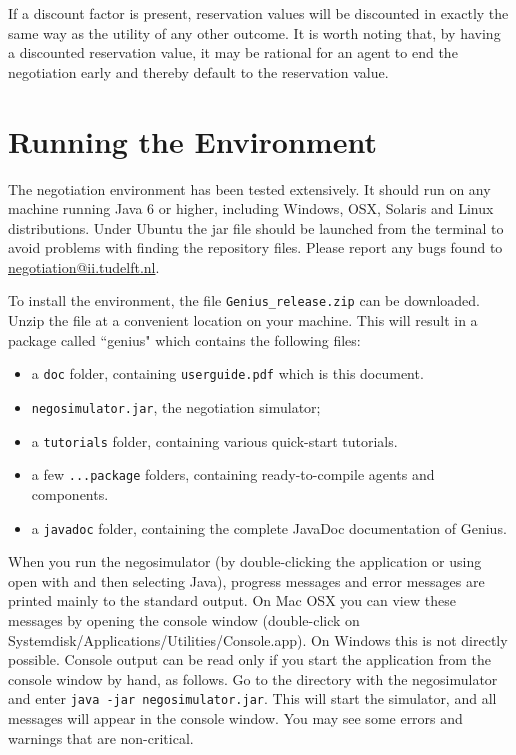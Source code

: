 \documentclass[]{article}
\begin{document}
If a discount factor is present, reservation values will be discounted in exactly the same way as the utility of any other outcome. It is worth noting that, by having a discounted reservation value, it may be rational for an agent to end the negotiation early and thereby default to the reservation value.
 
\section{Running the Environment}
The negotiation environment has been tested extensively. It should run on any machine running Java 6 or higher, including Windows, OSX, Solaris and Linux distributions. Under Ubuntu the jar file should be launched from the terminal to avoid problems with finding the repository files. Please report any bugs found to \url{negotiation@ii.tudelft.nl}.

To install the environment, the file \texttt{Genius\_release.zip} can be downloaded. Unzip the file at a convenient location on your machine. This will result in a package called ``genius" which contains the following files:

\begin{itemize}
	\item a \texttt{doc} folder, containing \texttt{userguide.pdf} which is this document.
	\item \texttt{negosimulator.jar}, the negotiation simulator;
	\item a \texttt{tutorials} folder, containing various quick-start tutorials.
	\item a few \texttt{...package} folders, containing ready-to-compile agents and components.
	\item  a \texttt{javadoc} folder, containing the complete JavaDoc documentation of Genius.
	
\end{itemize}

When you run the negosimulator (by double-clicking the application or using open with and then selecting Java), progress messages and error messages are printed mainly to the standard output. On Mac OSX you can view these messages by opening the console window (double-click on Systemdisk/Applications/Utilities/Console.app). On Windows this is not directly possible. Console output can be read only if you start the application from the console window by hand, as follows. Go to the directory with the negosimulator and enter
\texttt{java -jar negosimulator.jar}.
This will start the simulator, and all messages will appear in the console window. You may see some errors and warnings that are non-critical.
\end{document}
